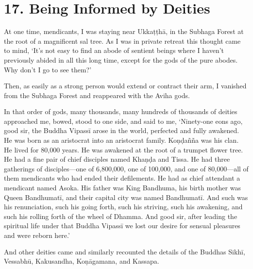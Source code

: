 \documentclass[12pt,openany]{book}%
\begin{document}
\section*{17. Being Informed by Deities }

At one time, mendicants, I was staying near \textsanskrit{Ukkaṭṭhā}, in the Subhaga Forest at the root of a magnificent sal tree. As I was in private retreat this thought came to mind, ‘It’s not easy to find an abode of sentient beings where I haven’t previously abided in all this long time, except for the gods of the pure abodes. Why don’t I go to see them?’ 

Then, as easily as a strong person would extend or contract their arm, I vanished from the Subhaga Forest and reappeared with the Aviha gods. 

In that order of gods, many thousands, many hundreds of thousands of deities approached me, bowed, stood to one side, and said to me, ‘Ninety-one eons ago, good sir, the Buddha \textsanskrit{Vipassī} arose in the world, perfected and fully awakened. He was born as an aristocrat into an aristocrat family. \textsanskrit{Koṇḍañña} was his clan. He lived for 80,000 years. He was awakened at the root of a trumpet flower tree. He had a fine pair of chief disciples named \textsanskrit{Khaṇḍa} and Tissa. He had three gatherings of disciples—one of 6,800,000, one of 100,000, and one of 80,000—all of them mendicants who had ended their defilements. He had as chief attendant a mendicant named Asoka. His father was King Bandhuma, his birth mother was Queen \textsanskrit{Bandhumatī}, and their capital city was named \textsanskrit{Bandhumatī}. And such was his renunciation, such his going forth, such his striving, such his awakening, and such his rolling forth of the wheel of Dhamma. And good sir, after leading the spiritual life under that Buddha \textsanskrit{Vipassī} we lost our desire for sensual pleasures and were reborn here.’ 

And other deities came and similarly recounted the details of the Buddhas \textsanskrit{Sikhī}, \textsanskrit{Vessabhū}, Kakusandha, \textsanskrit{Koṇāgamana}, and Kassapa. 
\end{document}
